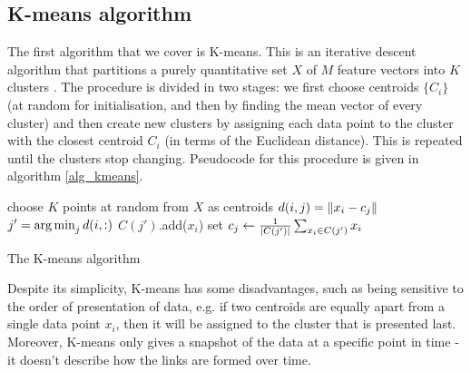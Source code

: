 \documentclass[../main.tex]{subfiles} \label{chapter_soa}
\begin{document}
\subsection{K-means algorithm} \label{subsection_kmeans}
The first algorithm that we cover is K-means. This is an iterative descent algorithm that partitions a purely quantitative set $X$ of $M$ feature vectors into $K$ clusters \cite{hastie2008}. The procedure is divided in two stages: we first choose centroids $\{C_i\}$ (at random for initialisation, and then by finding the mean vector of every cluster) and then create new clusters by assigning each data point to the cluster with the closest centroid $C_i$ (in terms of the Euclidean distance). This is repeated until the clusters stop changing. Pseudocode for this procedure is given in algorithm \ref{alg_kmeans}.
\begin{algorithm}
\begin{algorithmic}[1]
\State choose $K$ points at random from $X$ as centroids
\Repeat
{}
        \State $d(i,j) = \left\lVert x_i - c_j\right\rVert$
    \EndFor  
    \State $j' = \operatorname*{arg\,min}_j{d(i, :)}$
    \State $C(j')$.add($x_i$)
\EndFor
{}
    \State set $c_j \gets \frac{1}{\lvert C(j')\rvert}\sum_{x_i \in C(j')}{x_i}$
\EndFor  
{}
\EndFunction
\caption{The K-means algorithm}\label{alg_kmeans}
\end{algorithmic}
\end{algorithm}
\par Despite its simplicity, K-means has some disadvantages, such as being sensitive to the order of presentation of data, e.g. if two centroids are equally apart from a single data point $x_i$, then it will be assigned to the cluster that is presented last. Moreover, K-means only gives a snapshot of the data at a specific point in time - it doesn't describe how the links are formed over time. 
\end{document}
